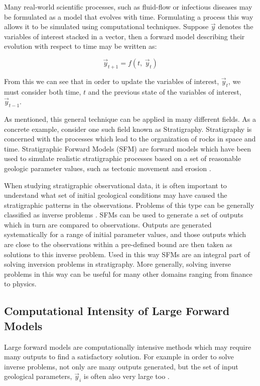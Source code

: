 \documentclass[12pt]{article}
\begin{document}
Many real-world scientific processes, such as fluid-flow or infectious diseases may be formulated as a model that evolves with time. Formulating a process this way allows it to be simulated using computational techniques. Suppose $\vec y$ denotes the variables of interest stacked in a vector, then a forward model describing their evolution with respect to time may be written as:

\begin{center}
	\begin{equation}
	\vec y_{t+1} = f(t, ~\vec y_t)
	\end{equation}
\end{center}

From this we can see that in order to update the variables of interest, $\vec y_t$, we must consider both time, $t$ and the previous state of the variables of interest, $\vec y_{t-1}$.


As mentioned, this general technique can be applied in many different fields. As a concrete example, consider one such field known as Stratigraphy. Stratigraphy is concerned with the processes which lead to the organization of rocks in space and time. Stratigraphic Forward Models (SFM) are forward models which have been used to simulate realistic stratigraphic processes based on a set of reasonable geologic parameter values, such as tectonic movement and erosion \cite{10.2110/pec.99.62.0069}.

When studying stratigraphic observational data, it is often important to understand what set of initial geological conditions may have caused the stratigraphic patterns in the observations. Problems of this type can be generally classified as inverse problems \cite{10.1260/0144598011492363}. SFMs can be used to generate a set of outputs which in turn are compared to observations. Outputs are generated systematically for a range of initial parameter values, and those outputs which are close to the observations within a pre-defined bound are then taken as solutions to this inverse problem. Used in this way SFMs are an integral part of solving inversion problems in stratigraphy. More generally, solving inverse problems in this way can be useful for many other domains ranging from finance to physics.


\subsection{Computational Intensity of Large Forward Models}
Large forward models are computationally intensive methods which may require many outputs to find a satisfactory solution. For example in order to solve inverse problems, not only are many outputs generated, but the set of input geological parameters, $\vec y_i$ is often also very large too \cite{10.1260/0144598011492363}.
\end{document}
